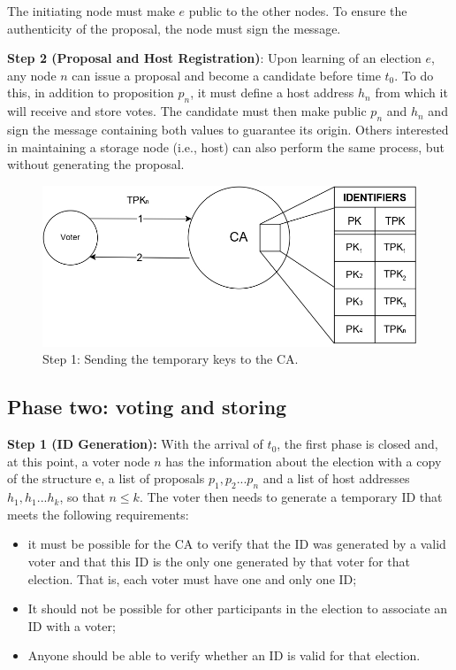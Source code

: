 \documentclass[english]{textolivre}
\begin{document}
The initiating node must make $e$ public to the other nodes. To ensure the authenticity of the proposal, the node must sign the message.

\textbf{Step 2 (Proposal and Host Registration)}: Upon learning of an election $e$, any node $n$ can issue a proposal and become a candidate before time $t_{0}$. To do this, in addition to proposition $p_{n}$, it must define a host address $h_{n}$ from which it will receive and store votes. The candidate must then make public $p_{n}$ and $h_{n}$ and sign the message containing both values to guarantee its origin. Others interested in maintaining a storage node (i.e., host) can also perform the same process, but without generating the proposal.



\begin{figure}[htb]
\centering
\begin{minipage}{.8\textwidth}
\includegraphics[width=\textwidth]{imagens/fig-002.png}
\caption{Step 1: Sending the temporary keys to the CA.}\label{fase2etapa1}
\end{minipage}
\end{figure}


\subsection{Phase two: voting and storing \label{sec-phase-two}}

\textbf{Step 1 (ID Generation):} With the arrival of $t_{0}$, the first phase is closed and, at this point, a voter node $n$ has the information about the election with a copy of the structure e, a list of proposals $p_{1}, p_{2} ... p_{n}$ and a list of host addresses $h_{1}, h_{1} ... h_{k}$, so that $n \le k$. The voter then needs to generate a temporary ID that meets the following requirements:

\begin{itemize}
\item it must be possible for the CA to verify that the ID was generated by a valid voter and that this ID is the only one generated by that voter for that election. That is, each voter must have one and only one ID;
 
\item It should not be possible for other participants in the election to associate an ID with a voter;

\item Anyone should be able to verify whether an ID is valid for that election.

\end{itemize}
\end{document}
